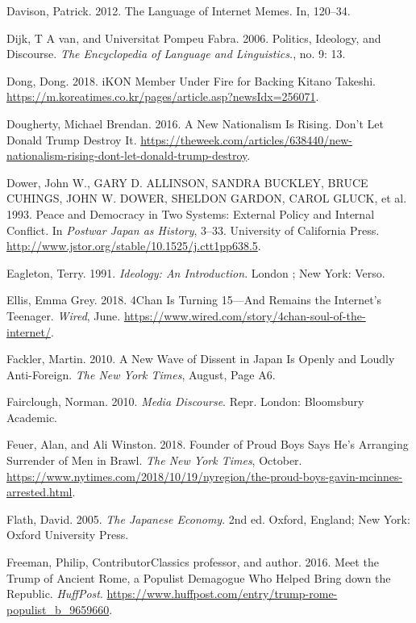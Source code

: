 \documentclass[10pt,british,A4paper,,openany]{memoir}
\begin{document}
\hypertarget{ref-davison_language_2012}{}
Davison, Patrick. 2012. The Language of Internet Memes. In, 120--34.

\hypertarget{ref-van_dijk_politics_2006}{}
Dijk, T A van, and Universitat Pompeu Fabra. 2006. Politics, Ideology,
and Discourse. \emph{The Encyclopedia of Language and Linguistics.}, no.
9: 13.

\hypertarget{ref-dong_ikon_2018}{}
Dong, Dong. 2018. iKON Member Under Fire for Backing Kitano Takeshi.
\url{https://m.koreatimes.co.kr/pages/article.asp?newsIdx=256071}.

\hypertarget{ref-dougherty_new_2016}{}
Dougherty, Michael Brendan. 2016. A New Nationalism Is Rising. Don't Let
Donald Trump Destroy It.
\url{https://theweek.com/articles/638440/new-nationalism-rising-dont-let-donald-trump-destroy}.

\hypertarget{ref-dower_peace_1993}{}
Dower, John W., GARY D. ALLINSON, SANDRA BUCKLEY, BRUCE CUHINGS, JOHN W.
DOWER, SHELDON GARDON, CAROL GLUCK, et al. 1993. Peace and Democracy in
Two Systems: External Policy and Internal Conflict. In \emph{Postwar
Japan as History}, 3--33. University of California Press.
\url{http://www.jstor.org/stable/10.1525/j.ctt1pp638.5}.

\hypertarget{ref-eagleton_ideology:_1991}{}
Eagleton, Terry. 1991. \emph{Ideology: An Introduction}. London ; New
York: Verso.

\hypertarget{ref-ellis_4chan_2018}{}
Ellis, Emma Grey. 2018. 4Chan Is Turning 15---And Remains the Internet's
Teenager. \emph{Wired}, June.
\url{https://www.wired.com/story/4chan-soul-of-the-internet/}.

\hypertarget{ref-fackler_new_2010-1}{}
Fackler, Martin. 2010. A New Wave of Dissent in Japan Is Openly and
Loudly Anti-Foreign. \emph{The New York Times}, August, Page A6.

\hypertarget{ref-fairclough_media_2010}{}
Fairclough, Norman. 2010. \emph{Media Discourse}. Repr. London:
Bloomsbury Academic.

\hypertarget{ref-feuer_founder_2018}{}
Feuer, Alan, and Ali Winston. 2018. Founder of Proud Boys Says He's
Arranging Surrender of Men in Brawl. \emph{The New York Times}, October.
\url{https://www.nytimes.com/2018/10/19/nyregion/the-proud-boys-gavin-mcinnes-arrested.html}.

\hypertarget{ref-flath_japanese_2005}{}
Flath, David. 2005. \emph{The Japanese Economy}. 2nd ed. Oxford,
England; New York: Oxford University Press.

\hypertarget{ref-freeman_meet_2016}{}
Freeman, Philip, ContributorClassics professor, and author. 2016. Meet
the Trump of Ancient Rome, a Populist Demagogue Who Helped Bring down
the Republic. \emph{HuffPost}.
\url{https://www.huffpost.com/entry/trump-rome-populist_b_9659660}.
\end{document}
